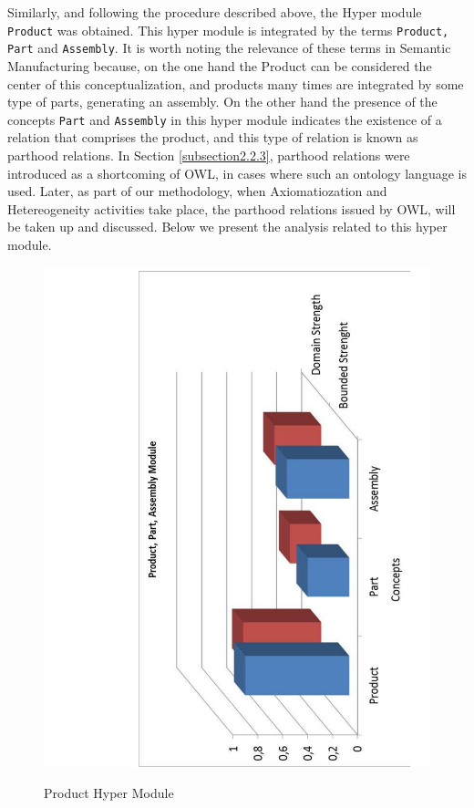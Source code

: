 Similarly, and following the procedure described above, the Hyper module \texttt{Product} was obtained. This hyper module is integrated   by the terms \texttt{Product, Part} and \texttt{Assembly}. It is worth noting the relevance of these terms in Semantic Manufacturing because,   on the one hand the Product can be considered the center of this conceptualization, and products many times are integrated by some type of parts, generating an assembly. On the other hand the presence of the concepts \texttt{Part} and \texttt{Assembly} in this hyper module indicates the existence of a relation that comprises the product, and this type of relation is known as parthood relations. In Section \ref{subsection2.2.3}, parthood relations were introduced as a shortcoming of   OWL, in cases where such an ontology language is used. Later, as part of our methodology, when Axiomatiozation and Hetereogeneity activities take place, the parthood relations issued by OWL, will be taken up and discussed. Below we present the analysis related to this hyper module. 


\begin{figure}
\begin{center}
	\includegraphics[scale=0.5, angle=-90]{figure-chapterIV/fig4-18.pdf}\\
	\caption{Product Hyper Module}
	\label{figure4-18}
\end{center}
\end{figure}

